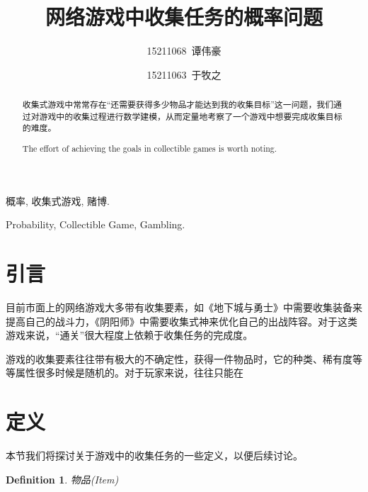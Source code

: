 \documentclass[10pt,journal,compsoc]{IEEEtran}
\begin{document}
\title{网络游戏中收集任务的概率问题}

\author{15211068~谭伟豪}
\author{15211063~于牧之}

\maketitle

\newtheorem{definition}{Definition}
\renewcommand{\abstractname}{摘 要}
\renewcommand{\figurename}{图}
\renewcommand{\tablename}{表}
\renewcommand{\IEEEkeywordsname}{关键词}
\begin{abstract}
收集式游戏中常常存在“还需要获得多少物品才能达到我的收集目标”这一问题，我们通过对游戏中的收集过程进行数学建模，从而定量地考察了一个游戏中想要完成收集目标的难度。
\end{abstract}
\renewcommand{\abstractname}{Abstract}
\begin{abstract}
The effort of achieving the goals in collectible games is worth noting. 
\end{abstract}

\begin{IEEEkeywords}
概率, 收集式游戏, 赌博.
\end{IEEEkeywords}
\renewcommand{\IEEEkeywordsname}{Keywords}
\begin{IEEEkeywords}
Probability, Collectible Game, Gambling.
\end{IEEEkeywords}

\section{引言}

目前市面上的网络游戏大多带有收集要素，如《地下城与勇士》中需要收集装备来提高自己的战斗力，《阴阳师》中需要收集式神来优化自己的出战阵容。对于这类游戏来说，“通关”很大程度上依赖于收集任务的完成度。

游戏的收集要素往往带有极大的不确定性，获得一件物品时，它的种类、稀有度等等属性很多时候是随机的。对于玩家来说，往往只能在



\section{定义}

本节我们将探讨关于游戏中的收集任务的一些定义，以便后续讨论。

\begin{definition}
  物品(Item)
\end{definition}
\end{document}
